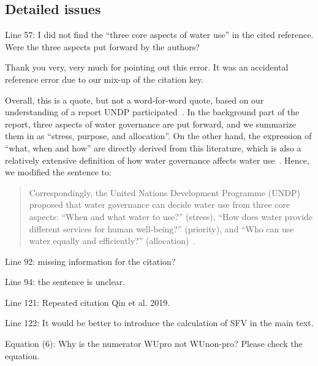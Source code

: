 \subsection{Detailed issues}

\RC{} Line 57: I did not find the ``three core aspects of water use'' in the cited reference. Were the three aspects put forward by the authors?

\AR Thank you very, very much for pointing out this error. It was an accidental reference error due to our mix-up of the citation key.

\AR*{} Overall, this is a quote, but not a word-for-word quote, based on our understanding of a report UNDP participated~\cite{mariajacobson2013}. In the background part of the report, three aspects of water governance are put forward, and we summarize them in as ``stress, purpose, and allocation''. On the other hand, the expression of ``what, when and how'' are directly derived from this literature, which is also a relatively extensive definition of how water governance affects water use~\cite{lasswell2018,allan2001,mariajacobson2013}. Hence, we modified the sentence to:

\begin{quote}
	Correspondingly, the United Nations Development Programme (UNDP) proposed that water governance can decide water use from three core aspects: ``When and what water to use?'' (stress), ``How does water provide different services for human well-being?'' (priority), and ``Who can use water equally and efficiently?'' (allocation)~\cite{mariajacobson2013}.
\end{quote}

\RC{} Line 92: missing information for the citation?

\RC{} Line 94: the sentence is unclear.

\RC{} Line 121: Repeated citation Qin et al. 2019.

\RC{} Line 122: It would be better to introduce the calculation of SFV in the main text.

\RC{} Equation (6): Why is the numerator WUpro not WUnon-pro? Please check the equation.

